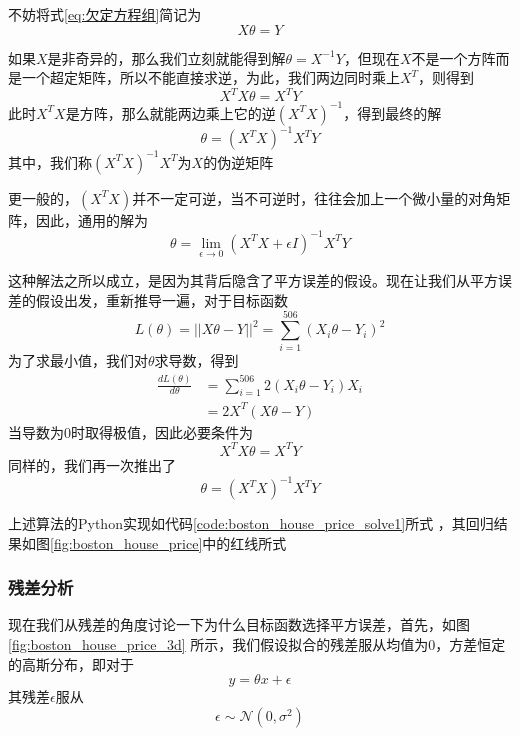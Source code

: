 不妨将式\ref{eq:欠定方程组}简记为
\begin{equation}
	X\theta = Y
\end{equation}

如果$X$是非奇异的，那么我们立刻就能得到解$\theta = X^{-1}Y$，但现在$X$不是一个方阵而是一个超定矩阵，所以不能直接求逆，为此，我们两边同时乘上$X^T$，则得到
\begin{equation}
	X^TX\theta = X^TY
\end{equation}
此时$X^TX$是方阵，那么就能两边乘上它的逆$(X^TX)^{-1}$，得到最终的解
\begin{equation}
	\theta = (X^TX)^{-1}X^TY
\end{equation}
其中，我们称$(X^TX)^{-1}X^T$为$X$的伪逆矩阵

更一般的，$(X^TX)$并不一定可逆，当不可逆时，往往会加上一个微小量的对角矩阵，因此，通用的解为
\begin{equation}
	\theta = \lim_{\epsilon\rightarrow 0}(X^TX + \epsilon I)^{-1}X^TY
\end{equation}


这种解法之所以成立，是因为其背后隐含了平方误差的假设。现在让我们从平方误差的假设出发，重新推导一遍，对于目标函数
\begin{equation}
	L(\theta) = || X\theta - Y||^2 = \sum_{i=1}^{506}(X_i\theta - Y_i)^2
\end{equation}
为了求最小值，我们对$\theta$求导数，得到
\begin{equation}
	\begin{split}
	\frac{d L(\theta)}{d \theta} &= \sum_{i=1}^{506}2(X_i\theta - Y_i)X_i\\
	&= 2X^T(X\theta - Y)
	\end{split}
\end{equation}
当导数为0时取得极值，因此必要条件为
\begin{equation}
X^TX\theta = X^TY
\end{equation}
同样的，我们再一次推出了
\begin{equation}
	\theta = (X^TX)^{-1}X^TY
\end{equation}

上述算法的Python实现如代码\ref{code:boston_house_price_solve1}所式	，其回归结果如图\ref{fig:boston_house_price}中的红线所式



\subsubsection{残差分析} %
\label{ssub:残差分析}
现在我们从残差的角度讨论一下为什么目标函数选择平方误差，首先，如图\ref{fig:boston_house_price_3d} 所示，我们假设拟合的残差服从均值为0，方差恒定的高斯分布，即对于
\begin{equation}
	y = \theta x + \epsilon
\end{equation}
其残差$\epsilon$服从
\begin{equation}
\epsilon \sim \mathcal{N}(0, \sigma^2)
\end{equation}

